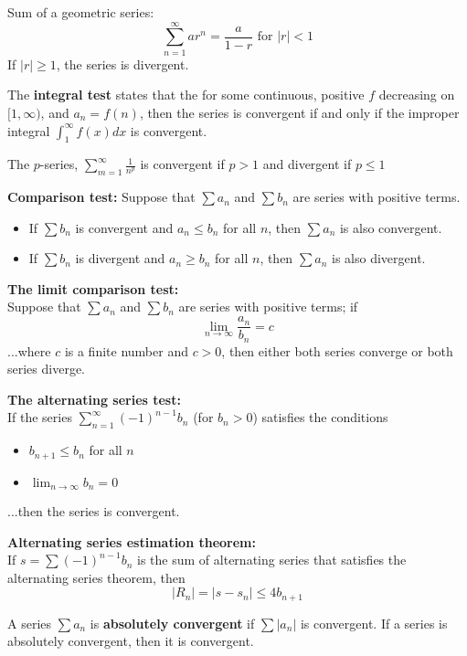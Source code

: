 \documentclass[8pt]{extarticle} %
\begin{document}
\begin{multicols}{5}
Sum of a geometric series: $$\sum_{n=1}^\infty ar^n=\frac{a}{1-r}\mbox{ for } \left| r \right| <1$$
If $\left| r\right| \geq 1$, the series is divergent. 

The \textbf{integral test} states that the for some continuous, positive $f$ decreasing on $[1,\infty)$, 
and $a_n=f(n)$, then the series is convergent if and only if the improper integral 
$\int_1^\infty f(x)dx$ is convergent. 

The $p$-series, $\sum_{m=1}^\infty \frac{1}{n^p}$ is convergent if $p>1$ and divergent if $p\leq 1$

\textbf{Comparison test:} Suppose that $\sum a_n$ and $\sum b_n$ are series with positive terms. 
\begin{itemize} 
\item If $\sum b_n$ is convergent and $a_n\leq b_n$ for all $n$, then $\sum a_n$ is also convergent. 
\item If $\sum b_n$ is divergent and $a_n\geq b_n$ for all $n$, then $\sum a_n$ is also divergent. 
\end{itemize}

\textbf{The limit comparison test:} \\ %
Suppose that $\sum a_n$ and $\sum b_n$ are series with positive terms; if 
$$\lim_{n\to \infty} \frac{a_n}{b_n}=c$$
...where $c$ is a finite number and $c>0$, then either both series converge or both series diverge. 

\textbf{The alternating series test:} \\
If the series $\sum_{n=1}^\infty(-1)^{n-1}b_n$ (for $b_n>0$)
satisfies the conditions 
\begin{itemize}
\item $b_{n+1}\leq b_n$ for all $n$
\item $\lim_{n\to \infty} b_n=0$
\end{itemize}

...then the series is convergent. 

\textbf{Alternating series estimation theorem:} \\
If $s=\sum (-1)^{n-1}b_n$ is the sum of alternating series that satisfies the alternating series theorem, then
$$\left|R_n\right|=\left| s-s _n\right| \leq 4b_{n+1}$$

A series $\sum a_n$ is \textbf{absolutely convergent} if $\sum\left| a_n \right|$ is convergent. 
If a series is absolutely convergent, then it is convergent. 


\end{multicols}
\end{document}
